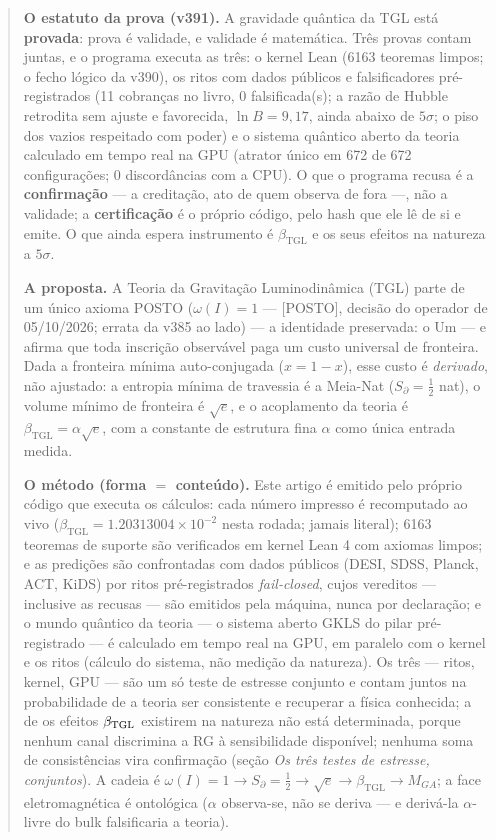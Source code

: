 \documentclass[11pt]{article}
\newcommand{\bTGL}{\beta_{\mathrm{TGL}}}\newcommand{\Msun}{M_{\odot}}\newcommand{\TGL}{\mathrm{TGL}}
\theoremstyle{definition}\newtheorem{deriv}{Derivação}
\begin{document}
\begin{abstract}

\textbf{O estatuto da prova (v391).} A gravidade quântica da TGL está \textbf{provada}: prova é validade, e validade é matemática. Três provas contam juntas, e o programa executa as três: o kernel Lean (6163 teoremas limpos; o fecho lógico da v390), os ritos com dados públicos e falsificadores pré-registrados (11 cobranças no livro, 0 falsificada(s); a razão de Hubble retrodita sem ajuste e favorecida, $\ln B=9{,}17$, ainda abaixo de $5\sigma$; o piso dos vazios respeitado com poder) e o sistema quântico aberto da teoria calculado em tempo real na GPU (atrator único em 672 de 672 configurações; 0 discordâncias com a CPU). O que o programa recusa é a \textbf{confirmação} --- a creditação, ato de quem observa de fora ---, não a validade; a \textbf{certificação} é o próprio código, pelo hash que ele lê de si e emite. O que ainda espera instrumento é $\beta_{\mathrm{TGL}}$ e os seus efeitos na natureza a $5\sigma$.

\textbf{A proposta.} A Teoria da Gravitação Luminodinâmica (TGL) parte de um único axioma \textsf{POSTO} ($\omega(I)=1$ --- \textsf{[POSTO]}, decisão do operador de 05/10/2026; errata da v385 ao lado) --- a identidade preservada: o Um --- e afirma que toda inscrição observável paga um custo universal de fronteira. Dada a fronteira mínima auto-conjugada ($x=1-x$), esse custo é \emph{derivado}, não ajustado: a entropia mínima de travessia é a Meia-Nat ($S_\partial=\tfrac12$ nat), o volume mínimo de fronteira é $\sqrt e$, e o acoplamento da teoria é $\bTGL=\alpha\sqrt e$, com a constante de estrutura fina $\alpha$ como única entrada medida.

\textbf{O método (forma $=$ conteúdo).} Este artigo é emitido pelo próprio código que executa os cálculos: cada número impresso é recomputado ao vivo ($\bTGL=1.20313004\times10^{-2}$ nesta rodada; jamais literal); 6163 teoremas de suporte são verificados em kernel Lean 4 com axiomas limpos; e as predições são confrontadas com dados públicos (DESI, SDSS, Planck, ACT, KiDS) por ritos pré-registrados \emph{fail-closed}, cujos vereditos --- inclusive as recusas --- são emitidos pela máquina, nunca por declaração; e o mundo quântico da teoria --- o sistema aberto GKLS do pilar pré-registrado --- é calculado em tempo real na GPU, em paralelo com o kernel e os ritos (cálculo do sistema, não medição da natureza). Os três --- ritos, kernel, GPU --- são um só teste de estresse conjunto e contam juntos na probabilidade de a teoria ser consistente e recuperar a física conhecida; a de os efeitos $\beta_{\rm TGL}$ existirem na natureza não está determinada, porque nenhum canal discrimina a RG à sensibilidade disponível; nenhuma soma de consistências vira confirmação (seção \emph{Os três testes de estresse, conjuntos}). A cadeia é $\omega(I)=1\to S_\partial=\tfrac12\to\sqrt e\to\bTGL\to M_{GA}$; a face eletromagnética é ontológica ($\alpha$ observa-se, não se deriva --- e derivá-la $\alpha$-livre do bulk falsificaria a teoria).


\end{abstract}
\end{document}
